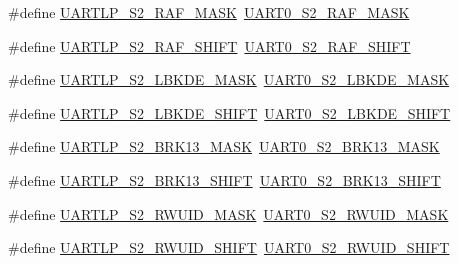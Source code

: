 \begin{DoxyCompactItemize}
\item 
\#define \hyperlink{group___backward___compatibility___symbols_gab739ff1ae228bcdf87973e919ad42c12}{U\+A\+R\+T\+L\+P\+\_\+\+S2\+\_\+\+R\+A\+F\+\_\+\+M\+A\+SK}~\hyperlink{group___u_a_r_t0___register___masks_gad94f9eb4b442dddbafa335f05b46fb12}{U\+A\+R\+T0\+\_\+\+S2\+\_\+\+R\+A\+F\+\_\+\+M\+A\+SK}
\item 
\#define \hyperlink{group___backward___compatibility___symbols_ga135975b0721bd170915cd4337759dfd7}{U\+A\+R\+T\+L\+P\+\_\+\+S2\+\_\+\+R\+A\+F\+\_\+\+S\+H\+I\+FT}~\hyperlink{group___u_a_r_t0___register___masks_ga8e9f146d124df7852ee019088189a84a}{U\+A\+R\+T0\+\_\+\+S2\+\_\+\+R\+A\+F\+\_\+\+S\+H\+I\+FT}
\item 
\#define \hyperlink{group___backward___compatibility___symbols_gaa783dcdafc362c97d89deca6d87ad1e0}{U\+A\+R\+T\+L\+P\+\_\+\+S2\+\_\+\+L\+B\+K\+D\+E\+\_\+\+M\+A\+SK}~\hyperlink{group___u_a_r_t0___register___masks_ga3347bd085733dc5c1d7ed86259528d60}{U\+A\+R\+T0\+\_\+\+S2\+\_\+\+L\+B\+K\+D\+E\+\_\+\+M\+A\+SK}
\item 
\#define \hyperlink{group___backward___compatibility___symbols_gace59d2986627e12405c737f49513fa0c}{U\+A\+R\+T\+L\+P\+\_\+\+S2\+\_\+\+L\+B\+K\+D\+E\+\_\+\+S\+H\+I\+FT}~\hyperlink{group___u_a_r_t0___register___masks_ga79be5f31bb69a54c78a60ae8859caa90}{U\+A\+R\+T0\+\_\+\+S2\+\_\+\+L\+B\+K\+D\+E\+\_\+\+S\+H\+I\+FT}
\item 
\#define \hyperlink{group___backward___compatibility___symbols_ga4ae8233f1781ea7dc494fc5eff1262df}{U\+A\+R\+T\+L\+P\+\_\+\+S2\+\_\+\+B\+R\+K13\+\_\+\+M\+A\+SK}~\hyperlink{group___u_a_r_t0___register___masks_gaeda16004cc22274e11f447311ec15362}{U\+A\+R\+T0\+\_\+\+S2\+\_\+\+B\+R\+K13\+\_\+\+M\+A\+SK}
\item 
\#define \hyperlink{group___backward___compatibility___symbols_ga43368a6f820ea82d1ee803cf7e94c5b1}{U\+A\+R\+T\+L\+P\+\_\+\+S2\+\_\+\+B\+R\+K13\+\_\+\+S\+H\+I\+FT}~\hyperlink{group___u_a_r_t0___register___masks_ga655fdc462508918f7874cb9078e0336b}{U\+A\+R\+T0\+\_\+\+S2\+\_\+\+B\+R\+K13\+\_\+\+S\+H\+I\+FT}
\item 
\#define \hyperlink{group___backward___compatibility___symbols_ga467467c8bbe352103ff116334710d766}{U\+A\+R\+T\+L\+P\+\_\+\+S2\+\_\+\+R\+W\+U\+I\+D\+\_\+\+M\+A\+SK}~\hyperlink{group___u_a_r_t0___register___masks_ga56d14f088c8bf415092b13fc8a7ff8eb}{U\+A\+R\+T0\+\_\+\+S2\+\_\+\+R\+W\+U\+I\+D\+\_\+\+M\+A\+SK}
\item 
\#define \hyperlink{group___backward___compatibility___symbols_ga21655fc24718467c5c7a3a17491ab20c}{U\+A\+R\+T\+L\+P\+\_\+\+S2\+\_\+\+R\+W\+U\+I\+D\+\_\+\+S\+H\+I\+FT}~\hyperlink{group___u_a_r_t0___register___masks_ga087e7d36d10ab05400ef6a3acbe6f83a}{U\+A\+R\+T0\+\_\+\+S2\+\_\+\+R\+W\+U\+I\+D\+\_\+\+S\+H\+I\+FT}

\end{DoxyCompactItemize}

